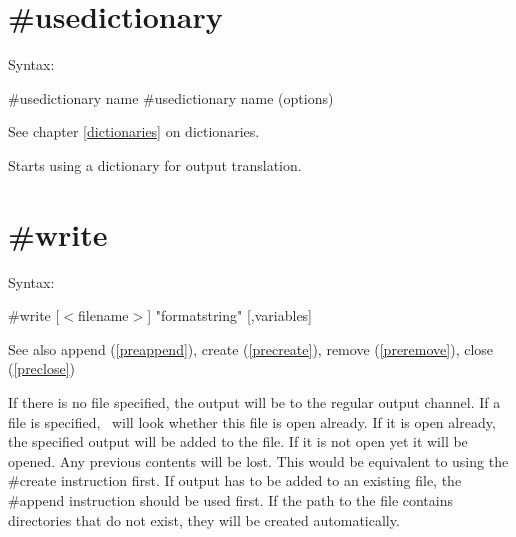 
\section{\#usedictionary}
\label{preusedictionary}

\noindent Syntax:

\#usedictionary name
\#usedictionary name (options)
 
\noindent See chapter \ref{dictionaries} on dictionaries.

\noindent Starts using a dictionary for output translation.


\section{\#write}
\label{prewrite}

\noindent Syntax:

\#write [$<$filename$>$] "formatstring" [,variables]
 
\noindent See also append (\ref{preappend}),
            create (\ref{precreate}), remove (\ref{preremove}),
            close (\ref{preclose})

\noindent If there is no file specified, the output will be 
to the regular output channel. If a file is 
specified, \FORM\ will look whether this file is open already. If it is open 
already, the specified output will be added to the file. If it is not open 
yet it will be opened. Any previous contents will be lost. This would be 
equivalent to using the \#create instruction first. If 
output has to be added to an existing file, the \#append 
instruction should be used first. If the path to the file contains 
directories that do not exist, they will be created automatically.

